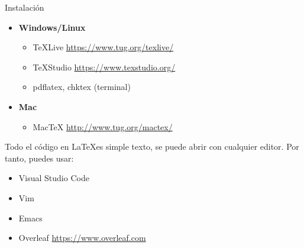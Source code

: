 \begin{frame}[fragile]{Instalación}
  \begin{itemize}
    \item \textbf{Windows/Linux}
          \begin{itemize}
            \item TeXLive \url{https://www.tug.org/texlive/}
            \item TeXStudio \url{https://www.texstudio.org/}
            \item pdflatex, chktex (terminal)
          \end{itemize}
    \item \textbf{Mac}
          \begin{itemize}
            \item MacTeX \url{http://www.tug.org/mactex/}
          \end{itemize}
  \end{itemize}
  Todo el código en \LaTeX es simple texto, se puede abrir con cualquier editor. Por tanto, puedes usar:
  \begin{itemize}
    \item{Visual Studio Code}
    \item {Vim}
    \item {Emacs}
    \item {Overleaf} \url{https://www.overleaf.com}
  \end{itemize}
\end{frame}
